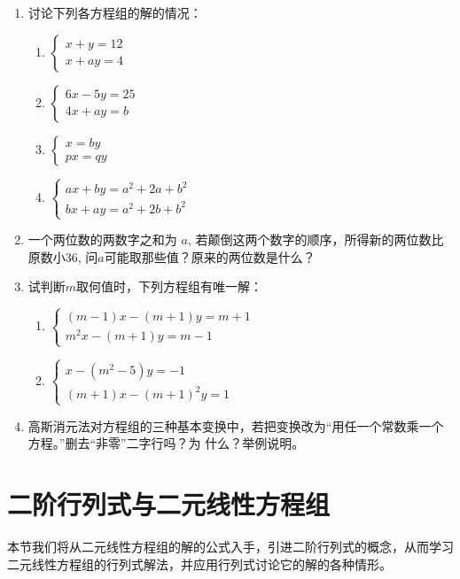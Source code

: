 \begin{enumerate}
    \item 讨论下列各方程组的解的情况：
\begin{multicols}{2}
\begin{enumerate}    
    \item $\begin{cases}
      x+y=12\\ x+ay=4  
    \end{cases}$
    \item $\begin{cases}
        6x-5y=25\\4x+ay=b
    \end{cases}$
    \item $\begin{cases}
        x=by\\px=qy
    \end{cases}$
    \item $\begin{cases}
        ax+by=a^2+2a+b^2\\
        bx+ay=a^2+2b+b^2
    \end{cases}$
\end{enumerate}    
\end{multicols}
    \item 一个两位数的两数字之和为 $a$, 若颠倒这两个数字的顺序，所得新的两位数比原数小36, 问$a$可能取那些值？原来的两位数是什么？
    \item 试判断$m$取何值时，下列方程组有唯一解：
\begin{enumerate}
    \item $\begin{cases}
        (m-1)x-(m+1)y=m+1\\ m^2x-(m+1)y=m-1
    \end{cases}$
    \item $\begin{cases}
x-(m^2-5)y=-1\\ (m+1)x -(m+1)^2y=1       
    \end{cases}$
\end{enumerate}

\item  高斯消元法对方程组的三种基本变换中，若把变换改为“用任一个常数乘一个方程。”删去“非零”二字行吗？为
什么？举例说明。
\end{enumerate}

\section{二阶行列式与二元线性方程组}
本节我们将从二元线性方程组的解的公式入手，引进二阶行列式的概念，从而学习二元线性方程组的行列式解法，并应用行列式讨论它的解的各种情形。

